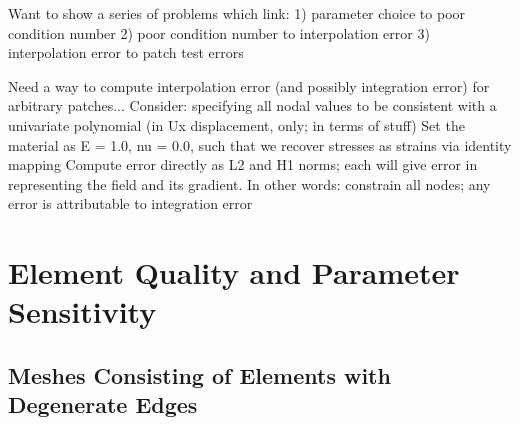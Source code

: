 Want to show a series of problems which link:
1) parameter choice to poor condition number
2) poor condition number to interpolation error
3) interpolation error to patch test errors

Need a way to compute interpolation error (and possibly integration error) for arbitrary patches...
Consider: specifying all nodal values to be consistent with a univariate polynomial (in Ux displacement, only; in terms of stuff)
Set the material as E = 1.0, nu = 0.0, such that we recover stresses as strains via identity mapping
Compute error directly as L2 and H1 norms; each will give error in representing the field and its gradient.
In other words: constrain all nodes; any error is attributable to integration error

\section{Element Quality and Parameter Sensitivity}

\subsection{Meshes Consisting of Elements with Degenerate Edges}


